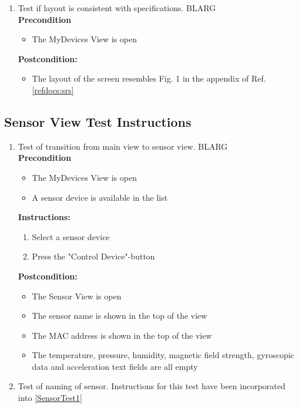 \documentclass[a4paper]{article}
\newlength{\testlabellength}
\newenvironment{testlist}{\begin{enumerate}[label=\bfseries Instruction \thesubsection.\arabic* , labelindent=0pt, labelwidth=\testlabellength , leftmargin=2cm]}{\end{enumerate}}
\newenvironment{precondition}{
{\color{white}BLARG}\\ 
\textbf{Precondition}
\begin{itemize}[labelindent=0cm, labelwidth=2cm , leftmargin=1cm]
}
{\end{itemize}}
\newenvironment{instruction}{
\textbf{Instructions:}
\begin{enumerate}[label=\bfseries  \arabic*., labelindent=0cm, labelwidth=2cm , leftmargin=1cm]
}
{\end{enumerate}}
\newenvironment{postcondition}{
\textbf{Postcondition:}
\begin{itemize}[labelindent=0cm, labelwidth=2cm , leftmargin=1cm]
}
{\end{itemize}}
\begin{document}
\begin{appendices}
\begin{testlist}
    \item Test if layout is consistent with specifications.
		\begin{precondition}
			\item The MyDevices View is open
		\end{precondition}
		\begin{postcondition}
 			\item The layout of the screen resembles Fig. 1 in the appendix of Ref. \ref{refdocs:srs}
		\end{postcondition}


\end{testlist}

\subsection{Sensor View Test Instructions}
\begin{testlist}

	\item Test of transition from main view to sensor view. \label{SensorTest1}
 		\begin{precondition}
 			\item The MyDevices View is open
 			\item A sensor device is available in the list
 		\end{precondition}
 		\begin{instruction}
 			\item Select a sensor device
 			\item Press the "Control Device"-button
 		\end{instruction}
 		\begin{postcondition}
 			\item The Sensor View is open
 			\item The sensor name is shown in the top of the view
 			\item The MAC address is shown in the top of the view
 			\item The temperature, pressure, humidity, magnetic field strength, gyroscopic data and acceleration text fields are all empty
 		\end{postcondition}

	\item Test of naming of sensor.
		Instructions for this test have been incorporated into \ref{SensorTest1}
		

\end{testlist}
\end{appendices}
\end{document}
